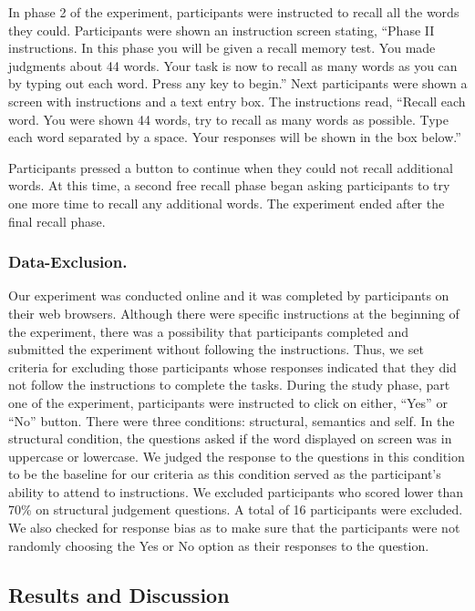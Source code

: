 \documentclass[
  man,floatsintext]{apa6}
\begin{document}
In phase 2 of the experiment, participants were instructed to recall all the words they could. Participants were shown an instruction screen stating, ``Phase II instructions. In this phase you will be given a recall memory test. You made judgments about 44 words. Your task is now to recall as many words as you can by typing out each word. Press any key to begin.'' Next participants were shown a screen with instructions and a text entry box. The instructions read, ``Recall each word. You were shown 44 words, try to recall as many words as possible. Type each word separated by a space. Your responses will be shown in the box below.''

Participants pressed a button to continue when they could not recall additional words. At this time, a second free recall phase began asking participants to try one more time to recall any additional words. The experiment ended after the final recall phase.

\hypertarget{data-exclusion.}{%
\subsubsection{Data-Exclusion.}\label{data-exclusion.}}

Our experiment was conducted online and it was completed by participants on their web browsers. Although there were specific instructions at the beginning of the experiment, there was a possibility that participants completed and submitted the experiment without following the instructions. Thus, we set criteria for excluding those participants whose responses indicated that they did not follow the instructions to complete the tasks. During the study phase, part one of the experiment, participants were instructed to click on either, ``Yes'' or ``No'' button. There were three conditions: structural, semantics and self. In the structural condition, the questions asked if the word displayed on screen was in uppercase or lowercase. We judged the response to the questions in this condition to be the baseline for our criteria as this condition served as the participant's ability to attend to instructions. We excluded participants who scored lower than 70\% on structural judgement questions. A total of 16 participants were excluded. We also checked for response bias as to make sure that the participants were not randomly choosing the Yes or No option as their responses to the question.

\hypertarget{results-and-discussion}{%
\subsection{Results and Discussion}\label{results-and-discussion}}
\end{document}
